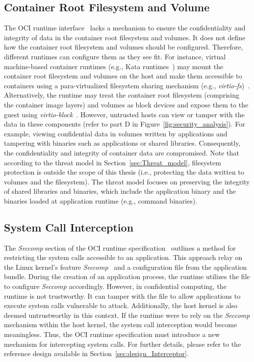 \subsection{Container Root Filesystem and Volume}

The OCI runtime interface~\cite*{oci-runtime-spec} lacks a mechanism to ensure the confidentiality and integrity of data in the container root filesystem and volumes. It does not define how the container root filesystem and volumes should be configured. Therefore, different runtimes can configure them as they see fit. For instance, virtual machine-based container 
runtimes (e.g., Kata runtimes~\cite*{Kata-Containers}) may mount the container root filesystem and volumes on the host and make them accessible to containers using a para-virtualized filesystem sharing mechanism (e.g., \emph{virtio-fs})~\cite*{kata_storage}. Alternatively, the runtime may treat the container root filesystem (comprising the container image layers) and volumes as block devices and expose them to the guest 
using \emph{virtio-block}~\cite*{kata_storage}. However, untrusted hosts can view or tamper with the data in these components (refer to part D in Figure~\ref{fig:security_analysis}). For example, viewing confidential data in volumes written by applications and tampering with binaries such as applications or shared libraries. Consequently, the confidentiality and 
integrity of container data are compromised. Note that according to the threat model in Section~\ref{sec:Threat_model}, filesystem protection is outside the scope of this thesis (i.e., protecting the data written to volumes and the filesystem). The threat model focuses on preserving the integrity of shared libraries and binaries, which include the application 
binary and the binaries loaded at application runtime (e.g., command binaries).


\subsection{System Call Interception}
\label{sec:security_analyse_oci_system_call}
The \emph{Seccomp} section of the OCI runtime specification~\cite*{oci-runtime-spec} outlines a method for restricting the system calls accessible to an application. This approach relay on the Linux kernel's feature \emph{Seccomp}~\cite*{seccomp} and a configuration file from the application bundle. During the creation of an application process, the runtime 
utilizes the file to configure \emph{Seccomp} accordingly. However, in confidential computing, the runtime is not trustworthy. It can tamper with the file to allow applications to execute system calls vulnerable to attack. Additionally, the host kernel is also deemed untrustworthy in this context. If the runtime were to rely on the \emph{Seccomp} mechanism 
within the host kernel, the system call interception would become meaningless. Thus, the OCI runtime specification must introduce a new mechanism for intercepting system calls. For further details, please refer to the reference design available in Section~\ref{sec:design_Interceptor}.



